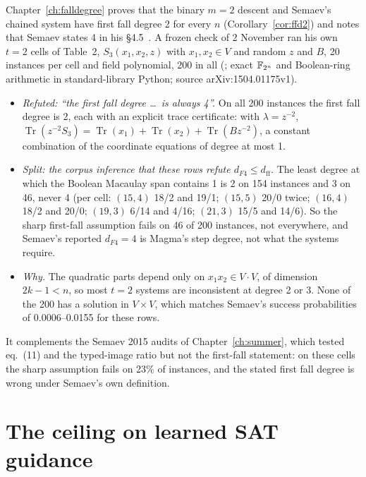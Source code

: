 Chapter~\ref{ch:falldegree} proves that the binary $m=2$ descent and
Semaev's chained system have first fall degree 2 for every $n$
(Corollary~\ref{cor:ffd2}) and notes that Semaev states 4 in his
\S4.5~\cite{semaev2015}. A frozen check of 2 November ran his own $t=2$
cells of Table~2, $S_3(x_1,x_2,z)$ with $x_1,x_2\in V$ and random $z$ and
$B$, 20 instances per cell and field polynomial, 200 in all
(; exact
$\mathbb{F}_{2^n}$ and Boolean-ring arithmetic in standard-library Python; source
arXiv:1504.01175v1).
\begin{itemize}
\item \emph{Refuted: ``the first fall degree \dots\ is always 4''.} On all 200
  instances the first fall degree is 2, each with an explicit trace
  certificate: with $\lambda=z^{-2}$,
  $\operatorname{Tr}(z^{-2}S_3)=\operatorname{Tr}(x_1)+\operatorname{Tr}(x_2)+\operatorname{Tr}(Bz^{-2})$,
  a constant combination of the coordinate equations of degree at most 1.
\item \emph{Split: the corpus inference that these rows refute
  $d_{F4}\le d_{\mathrm{ff}}$.} The least degree at which the Boolean
  Macaulay span contains 1 is 2 on 154 instances and 3 on 46, never 4
  (per cell: $(15,4)$ 18/2 and 19/1; $(15,5)$ 20/0 twice; $(16,4)$ 18/2 and
  20/0; $(19,3)$ 6/14 and 4/16; $(21,3)$ 15/5 and 14/6). So the sharp
  first-fall assumption fails on 46 of 200 instances, not everywhere, and
  Semaev's reported $d_{F4}=4$ is Magma's step degree, not what the systems
  require.
\item \emph{Why.} The quadratic parts depend only on $x_1x_2\in V\cdot V$, of
  dimension $2k-1<n$, so most $t=2$ systems are inconsistent at degree 2 or
  3. None of the 200 has a solution in $V\times V$, which matches Semaev's
  success probabilities of 0.0006--0.0155 for these rows.
\end{itemize}
It complements the Semaev 2015 audits of Chapter~\ref{ch:summer}, which
tested eq.~(11) and the typed-image ratio but not the first-fall statement:
on these cells the sharp assumption fails on 23\% of instances, and the
stated first fall degree is wrong under Semaev's own definition.

\section{The ceiling on learned SAT guidance}\label{sec:bd-sat}

